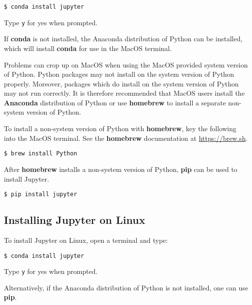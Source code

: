 \documentclass{book}
\newcommand{\passthrough}[1]{#1}
\begin{document}
\begin{lstlisting}
$ conda install jupyter
\end{lstlisting}

Type \passthrough{\lstinline!y!} for yes when prompted.

If \textbf{conda} is not installed, the Anaconda distribution of Python
can be installed, which will install \textbf{conda} for use in the MacOS
terminal.

Problems can crop up on MacOS when using the MacOS provided system
version of Python. Python packages may not install on the system version
of Python properly. Moreover, packages which do install on the system
version of Python may not run correctly. It is therefore recommended
that MacOS users install the \textbf{Anaconda} distribution of Python or
use \textbf{homebrew} to install a separate non-system version of
Python.

To install a non-system version of Python with \textbf{homebrew}, key
the following into the MacOS terminal. See the \textbf{homebrew}
documentation at \href{https://brew.sh/}{https://brew.sh}.

\begin{lstlisting}
$ brew install Python
\end{lstlisting}

After \textbf{homebrew} installs a non-system version of Python,
\textbf{pip} can be used to install Jupyter.

\begin{lstlisting}
$ pip install jupyter
\end{lstlisting}
    




    
        \hypertarget{installing-jupyter-on-linux}{%
\subsection{Installing Jupyter on
Linux}\label{installing-jupyter-on-linux}}

To install Jupyter on Linux, open a terminal and type:

\begin{lstlisting}
$ conda install jupyter
\end{lstlisting}

Type \passthrough{\lstinline!y!} for yes when prompted.

Alternatively, if the Anaconda distribution of Python is not installed,
one can use \textbf{pip}.
\end{document}
